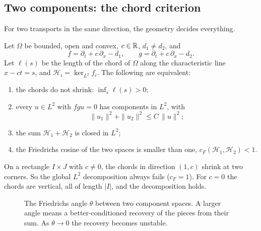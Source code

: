 \subsection{Two components: the chord criterion}

For two transports in the same direction, the geometry decides everything.

\begin{theorem}\label{thm:chord}
Let $\Omega$ be bounded, open and convex, $c\in\mathbb{R}$, $d_1\ne d_2$, and
\[
f=\partial_t+c\,\partial_x-d_1,\qquad g=\partial_t+c\,\partial_x-d_2 .
\]
Let $\ell(s)$ be the length of the chord of $\Omega$ along the characteristic line $x-ct=s$, and $\mathcal H_i=\ker_{L^2}f_i$. The following are equivalent:
\begin{enumerate}[label=(\alph*)]
\item the chords do not shrink: $\inf_s\ell(s)>0$;
\item every $u\in L^2$ with $fgu=0$ has components in $L^2$, with
\[
\|u_1\|^2+\|u_2\|^2\le C\,\|u\|^2 ;
\]
\item the sum $\mathcal H_1+\mathcal H_2$ is closed in $L^2$;
\item the Friedrichs cosine of the two spaces is smaller than one, $c_F(\mathcal H_1,\mathcal H_2)<1$.
\end{enumerate}
\end{theorem}

\begin{example}[{Rectangles}]
On a rectangle $I\times J$ with $c\ne0$, the chords in direction $(1,c)$ shrink at two corners. So the global $L^2$ decomposition always fails ($c_F=1$). For $c=0$ the chords are vertical, all of length $|I|$, and the decomposition holds.
\end{example}

\begin{figure}[!htb]
\centering
{}
\caption{The Friedrichs angle $\theta$ between two component spaces. A larger angle means a better-conditioned recovery of the pieces from their sum. As $\theta\to0$ the recovery becomes unstable.}\label{f:fig:friedrichs}
\end{figure}

